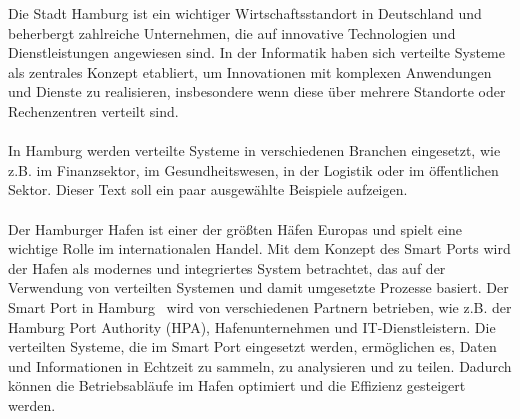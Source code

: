 \documentclass[../vs-script-first-v01.tex]{subfiles}
\begin{document}
Die Stadt Hamburg ist ein wichtiger Wirtschaftsstandort in Deutschland und beherbergt zahlreiche Unternehmen, die auf innovative Technologien und Dienstleistungen angewiesen sind. In der Informatik haben sich verteilte Systeme als zentrales Konzept etabliert, um Innovationen	 mit komplexen Anwendungen und Dienste zu realisieren, insbesondere wenn diese über mehrere Standorte oder Rechenzentren verteilt sind.
\\\\
In Hamburg werden verteilte Systeme in verschiedenen Branchen eingesetzt, wie z.B. im Finanzsektor, im Gesundheitswesen, in der Logistik oder im öffentlichen Sektor. Dieser Text soll ein paar ausgewählte Beispiele aufzeigen.
\\\\
Der Hamburger Hafen ist einer der größten Häfen Europas und spielt eine wichtige Rolle im internationalen Handel. Mit dem Konzept des Smart Ports wird der Hafen als modernes und integriertes System betrachtet, das auf der Verwendung von verteilten Systemen und damit umgesetzte Prozesse basiert.
Der Smart Port in Hamburg~\cite{HPA} wird von verschiedenen Partnern betrieben, wie z.B. der Hamburg Port Authority (HPA), Hafenunternehmen und IT-Dienstleistern. Die verteilten Systeme, die im Smart Port eingesetzt werden, ermöglichen es, Daten und Informationen in Echtzeit zu sammeln, zu analysieren und zu teilen. Dadurch können die Betriebsabläufe im Hafen optimiert und die Effizienz gesteigert werden.
\end{document}
